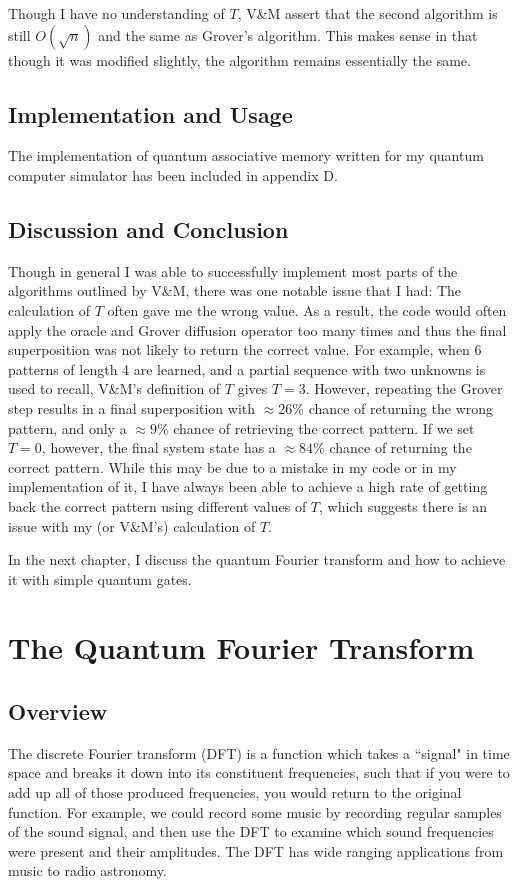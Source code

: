 \documentclass[11pt]{report}
\newcommand{\?}{\stackrel{?}{=}}
\begin{document}
Though I have no understanding of $T$, V\&M assert that the second algorithm is still $O(\sqrt{n})$ and the same as Grover's algorithm. This makes sense in that though it was modified slightly, the algorithm remains essentially the same.

\section{Implementation and Usage}
The implementation of quantum associative memory written for my quantum computer simulator has been included in appendix D.

\section{Discussion and Conclusion}

Though in general I was able to successfully implement most parts of the algorithms outlined by V\&M, there was one notable issue that I had: The calculation of $T$ often gave me the wrong value. As a result, the code would often apply the oracle and Grover diffusion operator too many times and thus the final superposition was not likely to return the correct value. For example, when 6 patterns of length 4 are learned, and a partial sequence with two unknowns is used to recall, V\&M's definition of $T$ gives $T=3$. However, repeating the Grover step results in a final superposition with $\approx26\%$ chance of returning the wrong pattern, and only a $\approx9\%$ chance of retrieving the correct pattern. If we set $T=0$, however, the final system state has a $\approx84\%$ chance of returning the correct pattern. While this may be due to a mistake in my code or in my implementation of it, I have always been able to achieve a high rate of getting back the correct pattern using different values of $T$, which suggests there is an issue with my (or V\&M's) calculation of $T$.

In the next chapter, I discuss the quantum Fourier transform and how to achieve it with simple quantum gates.

\chapter{The Quantum Fourier Transform}

\section{Overview}
The discrete Fourier transform (DFT) is a function which takes a ``signal" in time space and breaks it down into its constituent frequencies, such that if you were to add up all of those produced frequencies, you would return to the original function. For example, we could record some music by recording regular samples of the sound signal, and then use the DFT to examine which sound frequencies were present and their amplitudes. The DFT has wide ranging applications from music to radio astronomy.
\end{document}
